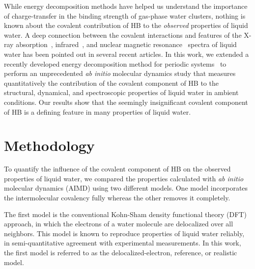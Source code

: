 \documentclass[journal=jacsat,manuscript=article]{achemso}
\begin{document}

While energy decomposition methods have helped us understand the importance of charge-transfer in the binding strength of gas-phase water clusters, nothing is known about the covalent contribution of HB to the \emph{observed} properties of liquid water. 
A deep connection between the covalent interactions and features of the X-ray absorption~\cite{NatureComm2013}, infrared~\cite{JPCL2013}, and nuclear magnetic resonance~\cite{NatureComm2015} spectra of liquid water has been pointed out in several recent articles. 
In this work, we extended a recently developed energy decomposition method for periodic systems~\cite{Khaliullin2013JCTC} to perform an unprecedented \emph{ab initio} molecular dynamics study that measures quantitatively the contribution of the covalent component of HB to the structural, dynamical, and spectroscopic properties of liquid water in ambient conditions. 
Our results show that the seemingly insignificant covalent component of HB is a defining feature in many properties of liquid water. 


\section{Methodology}

To quantify the influence of the covalent component of HB on the observed properties of liquid water, we compared the properties calculated with \emph{ab initio} molecular dynamics (AIMD) using two different models. 
One model incorporates the intermolecular covalency fully whereas the other removes it completely.

The first model is the conventional Kohn-Sham density functional theory (DFT) approach, in which the electrons of a water molecule are delocalized over all neighbors. 
This model is known to reproduce properties of liquid water reliably, in semi-quantitative agreement with experimental measurements. 
In this work, the first model is referred to as the delocalized-electron, reference, or realistic model. 
\end{document}
